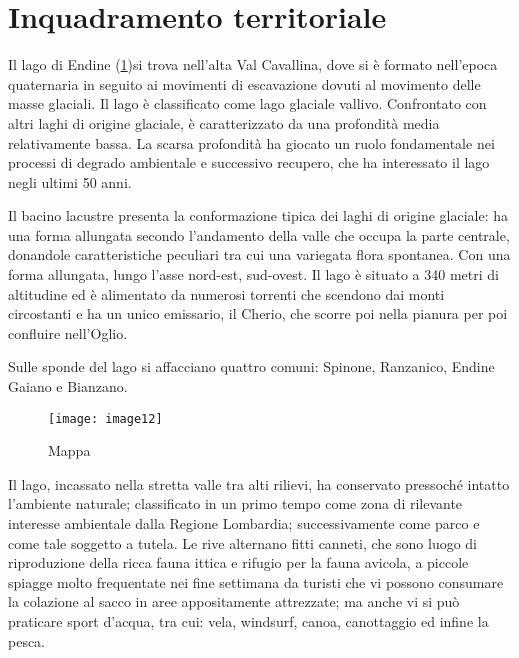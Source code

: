 \section{Inquadramento territoriale}

Il lago di Endine (\cref{fig:mappa})si trova nell'alta Val Cavallina, dove si è formato nell'epoca quaternaria in seguito ai movimenti di escavazione dovuti al movimento delle masse glaciali. Il lago è classificato come lago glaciale vallivo. Confrontato con altri laghi di origine glaciale, è caratterizzato da una profondità media relativamente bassa.
La scarsa profondità ha giocato un ruolo fondamentale nei processi di degrado ambientale e successivo recupero, che ha interessato il lago negli ultimi 50 anni. 

Il bacino lacustre presenta la conformazione tipica dei laghi di origine glaciale: ha una forma allungata secondo l’andamento della valle che occupa la parte centrale, donandole caratteristiche peculiari tra cui una variegata flora spontanea. 
Con una forma allungata, lungo l’asse nord-est, sud-ovest. Il lago è situato a 340 metri di altitudine ed è alimentato da numerosi torrenti che scendono dai monti circostanti e ha un unico emissario, il Cherio, che scorre poi nella pianura per poi confluire nell'Oglio.

Sulle sponde del lago si affacciano quattro comuni: Spinone, Ranzanico, Endine Gaiano e Bianzano.

\begin{figure}[H]
	\centering
	\texttt{[image: image12]}
	\caption{Mappa}
	\label{fig:mappa}
\end{figure}

Il lago, incassato nella stretta valle tra alti rilievi, ha conservato pressoché intatto l'ambiente naturale; classificato in un primo tempo come zona di rilevante interesse ambientale dalla Regione Lombardia; successivamente come parco e come tale soggetto a tutela. Le rive alternano fitti canneti, che sono luogo di riproduzione della ricca fauna ittica e rifugio per la fauna avicola, a piccole spiagge molto frequentate nei fine settimana da turisti che vi possono consumare la colazione al sacco in aree appositamente attrezzate; ma anche vi si può praticare  sport d'acqua, tra cui: vela, windsurf, canoa, canottaggio ed infine la pesca.

\begin{figure}[H]
	\captionsetup[subfloat]{farskip=2pt,captionskip=8pt}
	\centering
	\hspace{1cm}
\end{figure}

